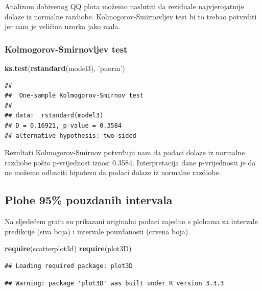 \documentclass[]{article}
\newenvironment{Shaded}{\begin{snugshade}}{\end{snugshade}}
\newcommand{\KeywordTok}[1]{\textcolor[rgb]{0.13,0.29,0.53}{\textbf{{#1}}}}
\newcommand{\StringTok}[1]{\textcolor[rgb]{0.31,0.60,0.02}{{#1}}}
\newcommand{\NormalTok}[1]{{#1}}
\begin{document}
Analizom dobivenog QQ plota možemo naslutiti da reziduale
najvjerojatnije dolaze iz normalne razdiobe. Kolmogorov-Smirnovljev test
bi to trebao potvrditi jer nam je veličina uzorka jako mala.

\subsubsection{Kolmogorov-Smirnovljev
test}\label{kolmogorov-smirnovljev-test-3}

\begin{Shaded}
\begin{Highlighting}[]
\KeywordTok{ks.test}\NormalTok{(}\KeywordTok{rstandard}\NormalTok{(model3), }\StringTok{'pnorm'}\NormalTok{)}
\end{Highlighting}
\end{Shaded}

\begin{verbatim}
## 
##  One-sample Kolmogorov-Smirnov test
## 
## data:  rstandard(model3)
## D = 0.16921, p-value = 0.3584
## alternative hypothesis: two-sided
\end{verbatim}

Rezultati Kolmogorov-Smirnov potvrđuju nam da podaci dolaze iz normalne
razdiobe pošto p-vrijednost iznosi 0.3584. Interpretacija dane
p-vrijednosti je da ne možemo odbaciti hipotezu da podaci dolaze iz
normalne razdiobe.

\subsection{Plohe 95\% pouzdanih
intervala}\label{plohe-95-pouzdanih-intervala}

Na sljedećem grafu su prikazani originalni podaci zajedno s plohama za
intervale predikcije (siva boja) i intervale pouzdanosti (crvena boja).

\begin{Shaded}
\begin{Highlighting}[]
\KeywordTok{require}\NormalTok{(scatterplot3d)}
\KeywordTok{require}\NormalTok{(plot3D)}
\end{Highlighting}
\end{Shaded}

\begin{verbatim}
## Loading required package: plot3D
\end{verbatim}

\begin{verbatim}
## Warning: package 'plot3D' was built under R version 3.3.3
\end{verbatim}
\end{document}
